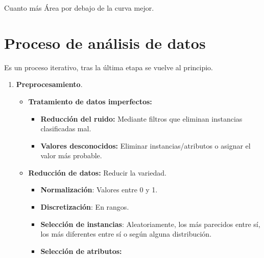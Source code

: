 \documentclass[12pt, twoside, openright]{report} %
\begin{document}
Cuanto más Área por debajo de la curva mejor.

\section{Proceso de análisis de
  datos}

Es un proceso iterativo, tras la última etapa se vuelve al principio.

\begin{enumerate}
	\def\labelenumi{\arabic{enumi}.}
	\item \textbf{Preprocesamiento}.

	      \begin{itemize}
		      \item \textbf{Tratamiento de datos imperfectos:}

		            \begin{itemize}
			            \item \textbf{Reducción del ruido:} Mediante filtros que eliminan
			                  instancias clasificadas mal.
			            \item \textbf{Valores desconocidos:} Eliminar instancias/atributos o
			                  asignar el valor más probable.
		            \end{itemize}
		      \item \textbf{Reducción de datos:} Reducir la variedad.

		            \begin{itemize}
			            \item \textbf{Normalización}: Valores entre 0 y 1.
			            \item \textbf{Discretización}: En rangos.
			            \item \textbf{Selección de instancias}: Aleatoriamente, los más
			                  parecidos entre sí, los más diferentes entre sí o según alguna
			                  distribución.
			            \item \textbf{Selección de atributos:}


\end{itemize}
\end{itemize}
\end{enumerate}
\end{document}
